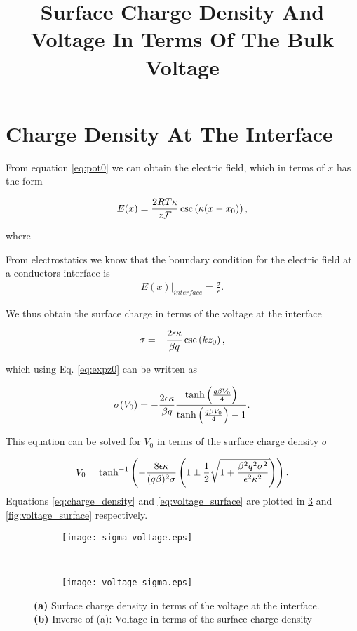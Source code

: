 \section{Charge Density At The Interface}

From equation \ref{eq:pot0} we can obtain the electric field, which in terms of $x$ has the form

\begin{align}
E(x) =  \frac{2RT\kappa}{z\mathcal{F}} \csc\left({\kappa(x-x_0)}\right),
\label{eq:efield0}
\end{align}

where

From electrostatics we know that the boundary condition for the electric field at a conductors interface is
\begin{align}
	E(x)\big|_{interface} = \frac{\sigma}{\epsilon}.
\end{align}

We thus obtain the surface charge in terms of the voltage at the interface

\begin{align}
	\sigma = -\frac{2 \epsilon \kappa}{\beta q} \csc\left({kz_0}\right),
\end{align}

which using Eq. \ref{eq:expz0} can be written as

\begin{align}\label{eq:charge_density}
	\sigma(V_0) = -\frac{2 \epsilon \kappa}{\beta q} \frac{\tanh\left({\frac{q\beta V_0}{4}}\right)}{\tanh\left({\frac{q\beta V_0}{4}}\right)-1}.
\end{align}

This equation can be solved for $V_0$ in terms of the surface charge density $\sigma$

\begin{align}
\label{eq:voltage_surface}
	V_0 = \tanh^{-1}\left({-\frac{8\epsilon\kappa}{(q \beta)^2 \sigma} \left({1 \pm \frac{1}{2}\sqrt{1+\frac{\beta^2 q^2\sigma^2}{\epsilon^2\kappa^2}}}\right)}\right).
\end{align}
Equations \ref{eq:charge_density} and \ref{eq:voltage_surface} are plotted in \ref{fig:charge_density} and \ref{fig:voltage_surface} respectively.

\begin{figure}[htbp!]
\centering
\title{Surface Charge Density And Voltage In Terms Of The Bulk Voltage}
\begin{subfigure}{\textwidth}
  \centering
  \texttt{[image: sigma-voltage.eps]}
  \caption{}
  \label{fig:sub1}
\end{subfigure}\\
\begin{subfigure}{\textwidth}
  \centering
  \texttt{[image: voltage-sigma.eps]}
  \caption{}
  \label{fig:sub2}
\end{subfigure}
\caption{\textbf{(a)} Surface charge density in terms of the voltage at the interface. \textbf{(b)} Inverse of (a): Voltage in terms of the surface charge density}
\label{fig:charge_density}
\end{figure}



